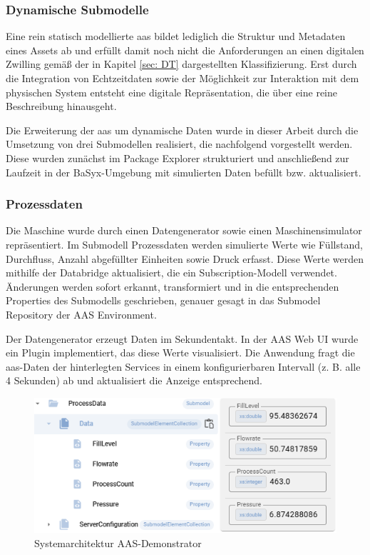 \subsubsection{Dynamische Submodelle}
Eine rein statisch modellierte \acs{aas} bildet lediglich die Struktur und Metadaten eines Assets ab und erfüllt damit noch nicht die Anforderungen an einen digitalen Zwilling gemäß der in Kapitel \ref{sec: DT} dargestellten Klassifizierung. 
Erst durch die Integration von Echtzeitdaten sowie der Möglichkeit zur Interaktion mit dem physischen System entsteht eine digitale Repräsentation, die über eine reine Beschreibung hinausgeht.

Die Erweiterung der \acs{aas} um dynamische Daten wurde in dieser Arbeit durch die Umsetzung von drei Submodellen realisiert, die nachfolgend vorgestellt werden. 
Diese wurden zunächst im Package Explorer strukturiert und anschließend zur Laufzeit in der BaSyx-Umgebung mit simulierten Daten befüllt bzw. aktualisiert.

\subsubsection*{Prozessdaten}
\vspace{-0.5em}

Die Maschine wurde durch einen Datengenerator sowie einen Maschinensimulator repräsentiert. 
Im Submodell Prozessdaten werden simulierte Werte wie Füllstand, Durchfluss, Anzahl abgefüllter Einheiten sowie Druck erfasst. 
Diese Werte werden mithilfe der Databridge aktualisiert, die ein Subscription-Modell verwendet. 
Änderungen werden sofort erkannt, transformiert und in die entsprechenden Properties des Submodells geschrieben, genauer gesagt in das Submodel Repository der AAS Environment.

Der Datengenerator erzeugt Daten im Sekundentakt. 
In der AAS Web UI wurde ein Plugin implementiert, das diese Werte visualisiert. 
Die Anwendung fragt die \acs{aas}-Daten der hinterlegten Services in einem konfigurierbaren Intervall (z. B. alle 4 Sekunden) ab und aktualisiert die Anzeige entsprechend.

\begin{figure}[htbp]
    \centering
        \includegraphics{Bilder/Ergebnisse/DynamischeDaten/ProcessData/Visualisierung.PNG}
    \caption{Systemarchitektur AAS-Demonstrator}
    \label{fig:Systemarchitektur}
\end{figure}

